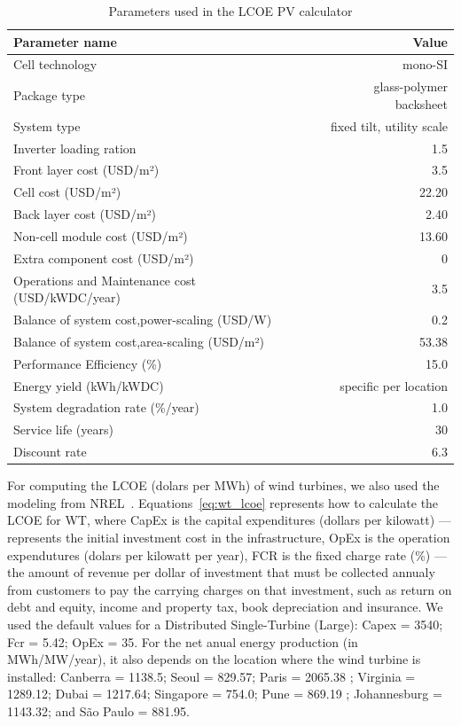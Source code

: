 \begin{table}[H]
  
  \caption{Parameters used in the LCOE PV calculator}\label{tab:parameters_pv_LCOE} \centering

  \begin{tabular}{|l|r|}
    \hline    
    \textbf{Parameter name} &   \textbf{Value} \\
    \hline
    Cell technology & mono-SI  \\
    \hline
    Package type  & glass-polymer backsheet \\
    \hline
    System type  & fixed tilt, utility scale \\
    \hline
    Inverter loading ration  & 1.5 \\
    \hline
    Front layer cost (USD/m²)   &  3.5 \\
    \hline
    Cell  cost (USD/m²)   &  22.20 \\
    \hline
    Back layer cost (USD/m²)   & 2.40 \\
    \hline
    Non-cell module cost (USD/m²)   &  13.60 \\
    \hline
    Extra component cost (USD/m²)   &  0 \\
    \hline
    Operations and Maintenance cost  (USD/kWDC/year)   &  3.5 \\
    \hline  
    Balance of system cost,power-scaling  (USD/W)   &  0.2 \\
    \hline  
    Balance of system cost,area-scaling  (USD/m²)   &  53.38 \\
    \hline  
    Performance Efficiency (\%) & 15.0  \\
    \hline
    Energy yield (kWh/kWDC) & specific per location \\
    \hline
    System degradation rate (\%/year)  & 1.0 \\
    \hline
    Service life (years) & 30 \\
    \hline
    Discount rate & 6.3 \\
    \hline
    

  \end{tabular}  
\end{table}


For computing the LCOE (dolars per MWh) of wind turbines, we also used the modeling from NREL~\cite{nrel_wt_costs_2021}. Equations~\eqref{eq:wt_lcoe} represents how to calculate the LCOE for WT, where CapEx is the capital expenditures (dollars per kilowatt) --- represents the initial investment cost in the infrastructure, OpEx is the operation expendutures (dolars per kilowatt per year), FCR is the fixed charge rate (\%) --- the amount of revenue per dollar of investment that must be collected annualy from customers to pay the carrying charges on that investment, such as return on debt and equity, income and property tax, book depreciation and insurance. We used the default values for a Distributed Single-Turbine (Large): Capex = 3540; Fcr = 5.42; OpEx = 35. For the net anual energy production (in MWh/MW/year), it also depends on the location where the wind turbine is installed: Canberra = 1138.5; Seoul  = 829.57; Paris = 2065.38 ; Virginia = 1289.12; Dubai = 1217.64; Singapore = 754.0; Pune =  869.19 ; Johannesburg = 1143.32; and São Paulo = 881.95.

